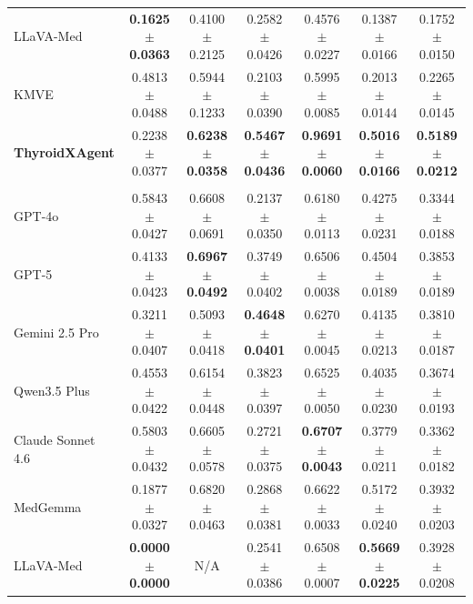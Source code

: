 \begin{table}[p]
\begin{threeparttable}
\begin{tabular}{lcccccc}
LLaVA-Med~\cite{li_llavamed_2023}
& \textbf{0.1625$\pm$0.0363}
& 0.4100$\pm$0.2125
& 0.2582$\pm$0.0426
& 0.4576$\pm$0.0227
& 0.1387$\pm$0.0166
& 0.1752$\pm$0.0150 \\

KMVE~\cite{li_ultrasound_2024}
& 0.4813$\pm$0.0488
& 0.5944$\pm$0.1233
& 0.2103$\pm$0.0390
& 0.5995$\pm$0.0085
& 0.2013$\pm$0.0144
& 0.2265$\pm$0.0145 \\

\rowcolor{lightgray}
\textbf{ThyroidXAgent}
& 0.2238$\pm$0.0377
& \textbf{0.6238$\pm$0.0358}
& \textbf{0.5467$\pm$0.0436}
& \textbf{0.9691$\pm$0.0060}
& \textbf{0.5016$\pm$0.0166}
& \textbf{0.5189$\pm$0.0212} \\

\midrule

\rowcolor{gray!20}
\multicolumn{7}{c}{\textbf{KMVE Testset} ($n=492$)} \\

GPT-4o~\cite{openai_gpt4_2024}
& 0.5843$\pm$0.0427
& 0.6608$\pm$0.0691
& 0.2137$\pm$0.0350
& 0.6180$\pm$0.0113
& 0.4275$\pm$0.0231
& 0.3344$\pm$0.0188 \\

GPT-5~\cite{openai2025gpt5systemcard}
& 0.4133$\pm$0.0423
& \textbf{0.6967$\pm$0.0492}
& 0.3749$\pm$0.0402
& 0.6506$\pm$0.0038
& 0.4504$\pm$0.0189
& 0.3853$\pm$0.0189 \\

Gemini 2.5 Pro~\cite{comanici_gemini_2025}
& 0.3211$\pm$0.0407
& 0.5093$\pm$0.0418
& \textbf{0.4648$\pm$0.0401}
& 0.6270$\pm$0.0045
& 0.4135$\pm$0.0213
& 0.3810$\pm$0.0187 \\

Qwen3.5 Plus~\cite{yang_qwen3_2025}
& 0.4553$\pm$0.0422
& 0.6154$\pm$0.0448
& 0.3823$\pm$0.0397
& 0.6525$\pm$0.0050
& 0.4035$\pm$0.0230
& 0.3674$\pm$0.0193 \\

Claude Sonnet 4.6
& 0.5803$\pm$0.0432
& 0.6605$\pm$0.0578
& 0.2721$\pm$0.0375
& \textbf{0.6707$\pm$0.0043}
& 0.3779$\pm$0.0211
& 0.3362$\pm$0.0182 \\

MedGemma~\cite{sellergren2025medgemma}
& 0.1877$\pm$0.0327
& 0.6820$\pm$0.0463
& 0.2868$\pm$0.0381
& 0.6622$\pm$0.0033
& 0.5172$\pm$0.0240
& 0.3932$\pm$0.0203 \\

LLaVA-Med~\cite{li_llavamed_2023}
& \textbf{0.0000$\pm$0.0000}\tnote{*}
& N/A\tnote{*}
& 0.2541$\pm$0.0386
& 0.6508$\pm$0.0007
& \textbf{0.5669$\pm$0.0225}
& 0.3928$\pm$0.0208 \\


\end{tabular}
\end{threeparttable}
\end{table}
